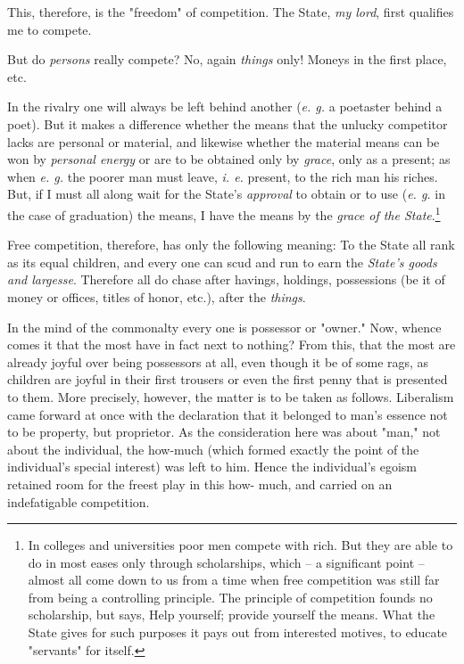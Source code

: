 \documentclass[a4paper]{book}
\begin{document}
This, therefore, is the "{}freedom"{} of competition. The State, \textit{my 
lord}, first qualifies me to compete.

But do \textit{persons} really compete? No, again \textit{things} only! Moneys 
in the first place, etc.

In the rivalry one will always be left behind another (\textit{e. g.} a 
poetaster behind a poet). But it makes a difference whether the means that the 
unlucky competitor lacks are personal or material, and likewise whether the 
material means can be won by \textit{personal energy} or are to be obtained 
only by \textit{grace}, only as a present; as when \textit{e. g.} the poorer 
man must leave, \textit{i. e.} present, to the rich man his riches. But, if I 
must all along wait for the State's \textit{approval} to obtain or to use 
(\textit{e. g.} in the case of graduation) the means, I have the means by the 
\textit{grace of the State}.\footnote{In colleges and universities poor men 
compete with rich. But they are able to do in most eases only through 
scholarships, which -- a significant point -- almost all come down to us from 
a time when free competition was still far from being a controlling principle. 
The principle of competition founds no scholarship, but says, Help yourself; 
provide yourself the means. What the State gives for such purposes it pays out 
from interested motives, to educate "{}servants"{} for itself.}

Free competition, therefore, has only the following meaning: To the State all 
rank as its equal children, and every one can scud and run to earn the 
\textit{State's goods and largesse}. Therefore all do chase after havings, 
holdings, possessions (be it of money or offices, titles of honor, etc.), 
after the \textit{things}.

In the mind of the commonalty every one is possessor or "{}owner."{} Now, 
whence comes it that the most have in fact next to nothing? From this, that 
the most are already joyful over being possessors at all, even though it be of 
some rags, as children are joyful in their first trousers or even the first 
penny that is presented to them. More precisely, however, the matter is to be 
taken as follows. Liberalism came forward at once with the declaration that it 
belonged to man's essence not to be property, but proprietor. As the 
consideration here was about "{}man,"{} not about the individual, the how-much 
(which formed exactly the point of the individual's special interest) was left 
to him. Hence the individual's egoism retained room for the freest play in 
this how- much, and carried on an indefatigable competition.
\end{document}
